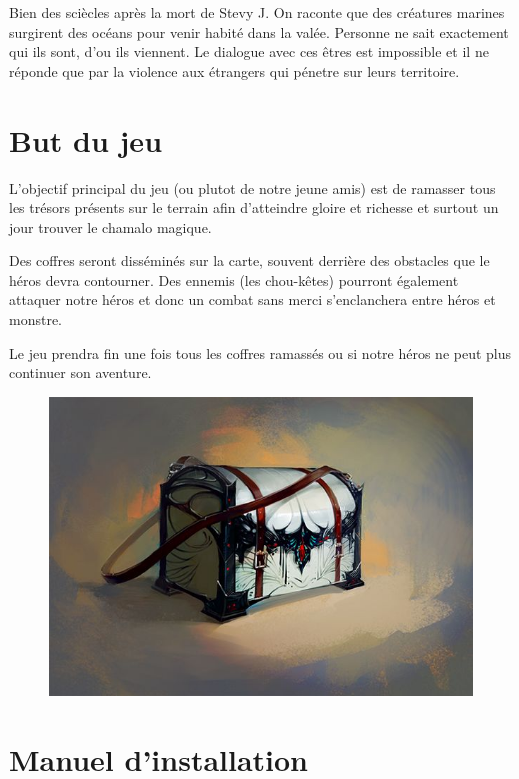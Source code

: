 \documentclass[a4paper 12pts]{article}
\begin{document}
Bien des sciècles après la mort de Stevy J. On raconte que des créatures marines surgirent des océans pour venir habité dans la valée.
Personne ne sait exactement qui ils sont, d'ou ils viennent. Le dialogue avec ces êtres est impossible et il ne réponde que par la violence aux étrangers qui
pénetre sur leurs territoire.




\section{But du jeu}

L'objectif principal du jeu (ou plutot de notre jeune amis) est de ramasser tous les trésors présents 
sur le terrain afin d'atteindre gloire et richesse et surtout un jour trouver le chamalo magique.

Des coffres seront disséminés sur la carte, souvent derrière des obstacles que le héros devra contourner. 
Des ennemis (les chou-kêtes) pourront également attaquer notre héros et donc un combat sans merci s'enclanchera entre héros et monstre.

Le jeu prendra fin une fois tous les coffres ramassés ou si notre héros ne peut plus continuer son aventure.


\begin{figure}[h]
   \includegraphics[width=350pt]{Illustration/coffre.jpg}
\end{figure}


\newpage

\section{Manuel d'installation}
\end{document}
